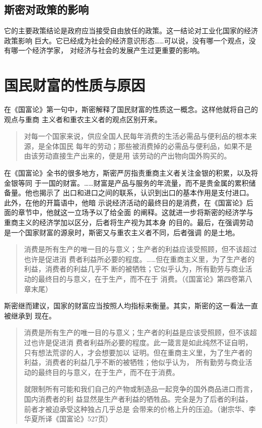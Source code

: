 \subsection{斯密对政策的影响}

它的主要政策结论是政府应当接受自由放任的政策。这一结论对工业化国家的经济政策影响
巨大。它已经成为社会的经济意识形态……可以说，没有哪一个观点，没有哪一个经济学家，
对经济与社会的发展产生过更重要的影响。

\section{国民财富的性质与原因}

在《国富论》第一句中，斯密解释了国民财富的性质这一概念。这样他就将自己的观点与重商
主义者和重农主义者的观点区别开来。

\begin{quotation}
对每一个国家来说，供应全国人民每年消费的生活必需品与便利品的根本来源，是全体国民
每年的劳动；那些被消费掉的必需品与便利品，如果不是由该劳动直接生产出来的，便是用
该劳动的产出物向国外购买的。
\end{quotation}

在《国富论》全书的很多地方，斯密严厉指责重商主义者关注金银的积累，以及将金银等同
于一国的财富。……财富是产品与服务的年流量，而不是贵金属的累积储备量。他也揭示了
出口和进口之间的联系，认识到出口的基本作用是支付进口。此外，在他的开篇语中，他暗
示说经济活动的最终目的是消费，在《国富论》后面的章节中，他就这一立场予以了给全面
的阐释。这就进一步将斯密的经济学与重商主义的经济学加以区分，后者将生产视为其本身
的目的。最后，在强调劳动是一个国家财富的源泉时，斯密又与重农主义者不同，后者强调
的是土地。

\begin{quotation}
  消费是所有生产的唯一目的与意义；生产者的利益应该受照顾，但不该超过也许是促进消
  费者利益所必要的程度。……但在重商主义里，为了生产者的利益，消费者的利益几乎不
  断的被牺牲；它似乎认为，所有勤劳与商业活动的最终目的与意义，在于生产，而不在于
  消费。（《国富论》第四卷第八章末尾）
\end{quotation}

斯密继而建议，国家的财富应当按照人均指标来衡量。其实，斯密的这一看法一直被继承到
现在。

\begin{quotation}
消费是所有生产的唯一目的与意义；生产者的利益是应该受照顾，但不该超过也许是促进消
费者利益所必要的程度。此一箴言是如此纯然不证自明，只有想法荒谬的人，才会想要加以
证明。但在重商主义里，为了生产者的利益，消费者的利益几乎不断的被牺牲；他似乎认为，
所有勤劳与商业活动的最终目的与意义，在于生产，而不在于消费。

就限制所有可能和我们自己的产物或制造品一起竞争的国外商品进口而言，国内消费者的利
益显然是生产者利益的牺牲品。完全是为了后者的利益，前者才被迫承受这种独占几乎总是
会带来的价格上升的压迫。（谢宗华、李华夏所译《国富论》527页）
\end{quotation}

